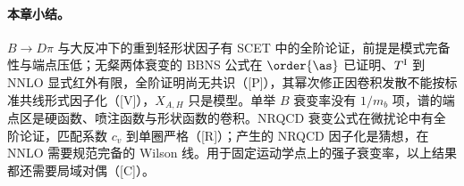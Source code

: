 \paragraph{本章小结。}
$B\to D\pi$ 与大反冲下的重到轻形状因子有 SCET 中的全阶论证，前提是模式完备性与端点压低；无粲两体衰变的 BBNS 公式在 $\order{\as}$ 已证明、$T^{\rm I}$ 到 NNLO 显式红外有限，全阶证明尚无共识（[P]），其幂次修正因卷积发散不能按标准共线形式因子化（[V]），$X_{A,H}$ 只是模型。单举 $B$ 衰变率没有 $1/m_b$ 项，谱的端点区是硬函数、喷注函数与形状函数的卷积。NRQCD 衰变公式在微扰论中有全阶论证，匹配系数 $c_v$ 到单圈严格（[R]）；产生的 NRQCD 因子化是猜想，在 NNLO 需要规范完备的 Wilson 线。用于固定运动学点上的强子衰变率，以上结果都还需要局域对偶（[C]）。
